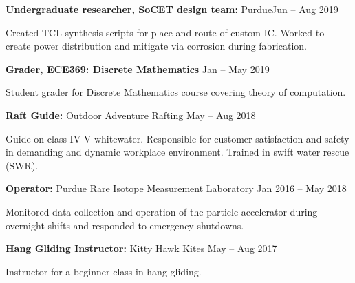 \documentclass{article}
\begin{document}
\textbf{Undergraduate researcher, SoCET design team:} Purdue\hfill Jun -- Aug 2019\\
\vspace{-12pt}
\begin{adjustwidth}{20pt}{}
Created TCL synthesis scripts for place and route of custom IC. Worked to create power distribution and mitigate via corrosion during fabrication.\\
\end{adjustwidth}

\vspace{-9pt}
\textbf{Grader, ECE369: Discrete Mathematics} \hfill Jan -- May 2019\\
\vspace{-12pt}
\begin{adjustwidth}{20pt}{}
Student grader for Discrete Mathematics course covering theory of computation.\\
\end{adjustwidth}
\vspace{-9pt}

\textbf{Raft Guide:} Outdoor Adventure Rafting \hfill May -- Aug 2018\\
\vspace{-12pt}
\begin{adjustwidth}{20pt}{}
Guide on class IV-V whitewater. Responsible for customer satisfaction and safety in demanding and dynamic workplace environment. Trained in swift water rescue (SWR).\\
\end{adjustwidth}
\vspace{-9pt}

\textbf{Operator:} Purdue Rare Isotope Measurement Laboratory \hfill Jan 2016 -- May 2018\\
\vspace{-12pt}
\begin{adjustwidth}{20pt}{}
Monitored data collection and operation of the particle accelerator during overnight shifts and responded to emergency shutdowns.\\
\end{adjustwidth}
\vspace{-9pt}

\textbf{Hang Gliding Instructor:} Kitty Hawk Kites \hfill  May -- Aug 2017\\
\vspace{-12pt}
\begin{adjustwidth}{20pt}{}
Instructor for a beginner class in hang gliding.
\end{adjustwidth}
\end{document}
